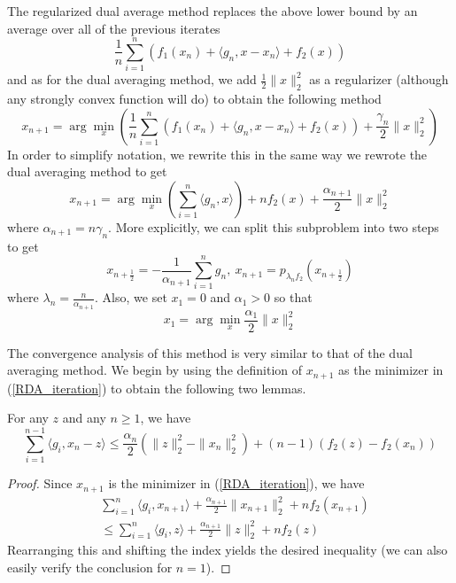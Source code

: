 The regularized dual average method replaces the above lower bound by an average over all of the previous iterates
\begin{equation}
 \frac{1}{n}\displaystyle\sum_{i = 1}^n (f_1(x_n) + \langle g_n, x - x_n\rangle + f_2(x))
\end{equation}
and as for the dual averaging method, we add $\frac{1}{2}\|x\|_2^2$ as a regularizer (although any strongly convex
function will do) to obtain the following method
\begin{equation}
 x_{n+1} = \arg\min_x\left(\frac{1}{n}\displaystyle\sum_{i = 1}^n (f_1(x_n) + \langle g_n, x - x_n\rangle + f_2(x)) + \frac{\gamma_n}{2}\|x\|_2^2\right)
\end{equation}
In order to simplify notation, we rewrite this in the same way we rewrote the dual averaging method to get
\begin{equation}\label{RDA_iteration}
 x_{n+1} = \arg\min_x \left(\displaystyle\sum_{i = 1}^n \langle g_n, x\rangle\right) + nf_2(x) + \frac{\alpha_{n+1}}{2}\|x\|_2^2
\end{equation}
where $\alpha_{n+1} = n\gamma_n$. More explicitly, we can split this subproblem into two steps to get
\begin{equation}
 x_{n+\frac{1}{2}} = -\frac{1}{\alpha_{n+1}}\displaystyle\sum_{i = 1}^n g_n,~x_{n+1} = p_{\lambda_nf_2}(x_{n+\frac{1}{2}})
\end{equation}
where $\lambda_n = \frac{n}{\alpha_{n+1}}$. Also, we set $x_1 = 0$ and $\alpha_1 > 0$ so that
\begin{equation}
 x_1 = \arg\min_x \frac{\alpha_1}{2}\|x\|_2^2
\end{equation}

The convergence analysis of this method is very similar to that of the dual averaging method. We begin by using the
definition of $x_{n+1}$ as the minimizer in (\ref{RDA_iteration}) to obtain the following two lemmas.

\begin{lemma}\label{lemma751}
 For any $z$ and any $n \geq 1$, we have
 \begin{equation}
  \displaystyle\sum_{i = 1}^{n-1} \langle g_i, x_n - z\rangle \leq \frac{\alpha_n}{2}(\|z\|_2^2 - \|x_n\|_2^2) + (n-1)(f_2(z) - f_2(x_n))
 \end{equation}

\end{lemma}
\begin{proof}
 Since $x_{n+1}$ is the minimizer in (\ref{RDA_iteration}), we have
 \begin{align}
  &\displaystyle\sum_{i = 1}^n \langle g_i, x_{n+1}\rangle + \frac{\alpha_{n+1}}{2}\|x_{n+1}\|_2^2 + nf_2(x_{n+1}) \\
  &\leq \displaystyle\sum_{i = 1}^n \langle g_i, z\rangle + \frac{\alpha_{n+1}}{2}\|z\|_2^2+ nf_2(z)
 \end{align}
 Rearranging this and shifting the index yields the desired inequality (we can also easily verify the conclusion for $n = 1$).
\end{proof}

